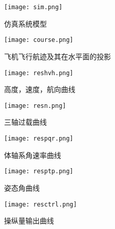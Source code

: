 \begin{figure}[!h]
\centering\texttt{[image: sim.png]}
\caption{仿真系统模型}
\label{sim}
\end{figure}

\begin{figure}[!h]
\centering\texttt{[image: course.png]}
\caption{飞机飞行航迹及其在水平面的投影}
\label{course}
\end{figure}

\begin{figure}[!h]
\centering\texttt{[image: reshvh.png]}
\caption{高度，速度，航向曲线}
\label{course}
\end{figure}

\begin{figure}[!h]
\centering\texttt{[image: resn.png]}
\caption{三轴过载曲线}
\label{course}
\end{figure}

\begin{figure}[!h]
\centering\texttt{[image: respqr.png]}
\caption{体轴系角速率曲线}
\label{course}
\end{figure}

\begin{figure}[!h]
\centering\texttt{[image: resptp.png]}
\caption{姿态角曲线}
\label{course}
\end{figure}

\begin{figure}[!h]
\centering\texttt{[image: resctrl.png]}
\caption{操纵量输出曲线}
\label{course}
\end{figure}

\endinput
